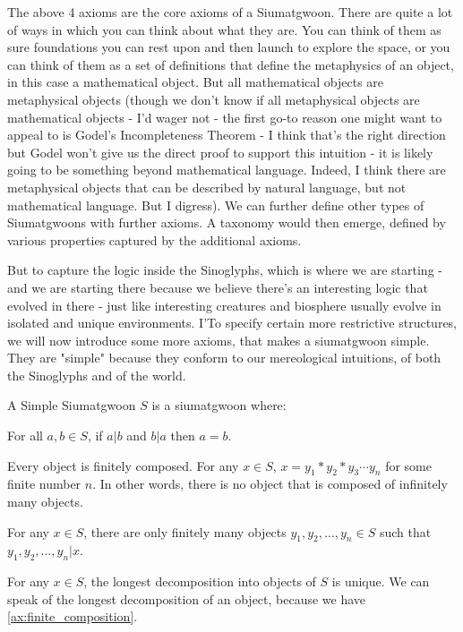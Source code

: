 The above 4 axioms are the core axioms of a Siumatgwoon. There are quite a lot of ways in which you can think about what they are. You can think of them as sure foundations you can rest upon and then launch to explore the space, or you can think of them as a set of definitions that define the metaphysics of an object, in this case a mathematical object. But all mathematical objects are metaphysical objects (though we don't know if all metaphysical objects are mathematical objects - I'd wager not - the first go-to reason one might want to appeal to is Godel's Incompleteness Theorem - I think that's the right direction but Godel won't give us the direct proof to support this intuition - it is likely going to be something beyond mathematical language. Indeed, I think there are metaphysical objects that can be described by natural language, but not mathematical language. But I digress). We can further define other types of Siumatgwoons with further axioms. A taxonomy would then emerge, defined by various properties captured by the additional axioms.

But to capture the logic inside the Sinoglyphs, which is where we are starting - and we are starting there because we believe there's an interesting logic that evolved in there - just like interesting creatures and biosphere usually evolve in isolated and unique environments. I'To specify certain more restrictive structures, we will now introduce some more axioms, that makes a siumatgwoon simple. They are "simple" because they conform to our mereological intuitions, of both the Sinoglyphs and of the world.

\begin{definition}\label{def:simple}
A Simple Siumatgwoon $S$ is a siumatgwoon where:
\begin{axiom}[Antisymmetry]\label{ax:antisymmetry}
    For all $a,b\in S$, if $a|b$ and $b|a$ then $a=b$.
\end{axiom}
\begin{axiom}\label{ax:finite_composition} 
    Every object is finitely composed. For any $x\in S$, $x = y_1 * y_2 * y_3 \cdots y_n$ for some finite number $n$.
    In other words, there is no object that is composed of infinitely many objects.
\end{axiom}
    
\begin{axiom}\label{ax:finite_constitution} 
For any $x \in S$, there are only finitely many objects $y_1, y_2, \ldots, y_n \in S$ such that $y_1, y_2, \ldots, y_n | x$.
\end{axiom}

\begin{axiom}\label{ax:unique-decomposition} 
    For any $x\in S$, the longest decomposition into objects of $S$ is unique. We can speak of the longest decomposition of an object, because we have \ref{ax:finite_composition}.
\end{axiom}
\end{definition}

